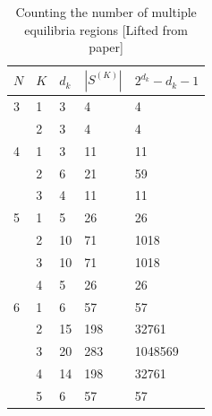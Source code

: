 \begin{table}[htb!]
	\centering
	\begin{tabular}[c]{|lllll|}
		\hline\hline
		$N$ & $K$ & $d_k$ & $|S^{(K)}|$ & $2^{d_k} - d_k - 1$\\
		\hline
		3 & 1 & 3 & 4 & 4 \\ 
		  & 2 & 3 & 4 & 4 \\
		\hline 
		4 & 1 & 3 & 11 & 11 \\ 
		& 2 & 6 & 21 & 59 \\ 
		& 3 & 4 & 11 & 11 \\ 
		\hline 
		5 & 1 & 5 & 26 & 26 \\
		& 2 & 10 & 71 & 1018 \\
		& 3 & 10 & 71 & 1018 \\
		& 4 & 5 & 26 & 26 \\
		\hline 
		6 & 1 & 6 & 57 & 57 \\
		& 2 & 15 & 198 & 32761\\
		& 3 & 20 & 283 & 1048569 \\
		& 4 & 14 & 198 & 32761 \\ 
		& 5 & 6 & 57  & 57\\
		\hline\hline
	\end{tabular}
	\caption{Counting the number of multiple equilibria regions [Lifted from paper]}
	\label{table:BK-1}
\end{table}

